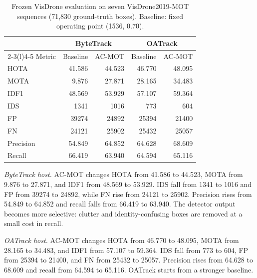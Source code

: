 \documentclass[pdflatex,sn-mathphys-num,iicol]{sn-jnl}
\begin{document}
\begin{table}[t]
\caption{Frozen VisDrone evaluation on seven VisDrone2019-MOT sequences
(71,830 ground-truth boxes). Baseline: fixed operating point (1536, 0.70).}
\label{tab:visdrone}
\centering\footnotesize
\setlength{\tabcolsep}{4pt}
\begin{tabular}{@{}lrrrr@{}}
\toprule
 & \multicolumn{2}{c}{ByteTrack} & \multicolumn{2}{c}{OATrack}\\
\cmidrule(lr){2-3}\cmidrule(l){4-5}
Metric & Baseline & AC-MOT & Baseline & AC-MOT\\
\midrule
HOTA & 41.586 & 44.523 & 46.770 & 48.095\\
MOTA & 9.876 & 27.871 & 28.165 & 34.483\\
IDF1 & 48.569 & 53.929 & 57.107 & 59.364\\
IDS & 1341 & 1016 & 773 & 604\\
FP & 39274 & 24892 & 25394 & 21400\\
FN & 24121 & 25902 & 25432 & 25057\\
Precision & 54.849 & 64.852 & 64.628 & 68.609\\
Recall & 66.419 & 63.940 & 64.594 & 65.116\\
\bottomrule
\end{tabular}
\end{table}

\emph{ByteTrack host.} AC-MOT changes HOTA from 41.586 to 44.523, MOTA from
9.876 to 27.871, and IDF1 from 48.569 to 53.929. IDS fall from 1341 to 1016
and FP from 39274 to 24892, while FN rise from 24121 to 25902. Precision rises
from 54.849 to 64.852 and recall falls from 66.419 to 63.940. The detector
output becomes more selective: clutter and identity-confusing boxes are
removed at a small cost in recall.

\emph{OATrack host.} AC-MOT changes HOTA from 46.770 to 48.095, MOTA from
28.165 to 34.483, and IDF1 from 57.107 to 59.364. IDS fall from 773 to 604, FP
from 25394 to 21400, and FN from 25432 to 25057. Precision rises from 64.628 to
68.609 and recall from 64.594 to 65.116. OATrack starts from a stronger
baseline.
\end{document}

